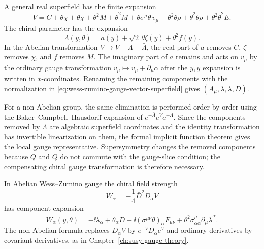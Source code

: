 A general real superfield has the finite expansion
\[
  V=C+\theta\chi+\bar\theta\bar\chi+\theta^2M+\bar\theta^2\bar M
  +\theta\sigma^\mu\bar\theta\,v_\mu
  +\theta^2\bar\theta\bar\rho
  +\bar\theta^2\theta\rho
  +\theta^2\bar\theta^2E .
\]
The chiral parameter has the expansion
\[
  \Lambda(y,\theta)
  =
  a(y)+\sqrt2\,\theta\zeta(y)+\theta^2 f(y).
\]
In the Abelian transformation \(V\mapsto V-\Lambda-\bar\Lambda\), the real
part of \(a\) removes \(C\), \(\zeta\) removes \(\chi\), and \(f\) removes
\(M\).  The imaginary part of \(a\) remains and acts on \(v_\mu\) by the
ordinary gauge transformation \(v_\mu\mapsto v_\mu+\partial_\mu\alpha\) after
the \(y,\bar y\) expansion is written in \(x\)-coordinates.  Renaming the
remaining components with the normalization in
\eqref{eq:wess-zumino-gauge-vector-superfield} gives
\((A_\mu,\lambda,\bar\lambda,D)\).

For a non-Abelian group, the same elimination is performed order by order
using the Baker--Campbell--Hausdorff expansion of
\(e^{-\bar\Lambda}e^Ve^{-\Lambda}\).  Since the components removed by
\(\Lambda\) are algebraic superfield coordinates and the identity
transformation has invertible linearization on them, the formal implicit
function theorem gives the local gauge representative.  Supersymmetry
changes the removed components because \(Q\) and \(\bar Q\) do not commute
with the gauge-slice condition; the compensating chiral gauge transformation
is therefore necessary.

In Abelian Wess--Zumino gauge the chiral field strength
\[
  W_\alpha=-\frac14\bar D^2D_\alpha V
\]
has component expansion
\[
  W_\alpha(y,\theta)
  =
  -\ii\lambda_\alpha
  +\theta_\alpha D
  -\ii(\sigma^{\mu\nu}\theta)_\alpha F_{\mu\nu}
  +\theta^2\sigma^\mu_{\alpha\dot\alpha}
  \partial_\mu\bar\lambda^{\dot\alpha}.
\]
The non-Abelian formula replaces \(D_\alpha V\) by
\(e^{-V}D_\alpha e^V\) and ordinary derivatives by covariant derivatives, as
in Chapter~\ref{ch:susy-gauge-theory}.

